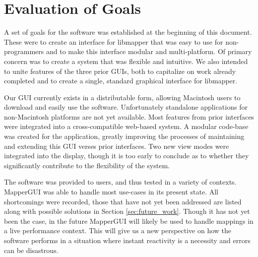 \section{Evaluation of Goals} %
\label{sec:evaluation_of_goals}

A set of goals for the software was established at the beginning of this document. These were to create an interface for libmapper that was easy to use for non-programmers and to make this interface modular and multi-platform. Of primary concern was to create a system that was flexible and intuitive. We also intended to unite features of the three prior GUIs, both to capitalize on work already completed and to create a single, standard graphical interface for libmapper. 

Our GUI currently exists in a distributable form, allowing Macintosh users to download and easily use the software. Unfortunately standalone applications for non-Macintosh platforms are not yet available. Most features from prior interfaces were integrated into a cross-compatible web-based system. A modular code-base was created for the application, greatly improving the processes of maintaining and extending this GUI verses prior interfaces. Two new view modes were integrated into the display, though it is too early to conclude as to whether they significantly contribute to the flexibility of the system.

The software was provided to users, and thus tested in a variety of contexts. MapperGUI was able to handle most use-cases in its present state. All shortcomings were recorded, those that have not yet been addressed are listed along with possible solutions in Section \ref{sec:future_work}. Though it has not yet been the case, in the future MapperGUI will likely be used to handle mappings in a live performance context. This will give us a new perspective on how the software performs in a situation where instant reactivity is a necessity and errors can be disastrous. 
	




